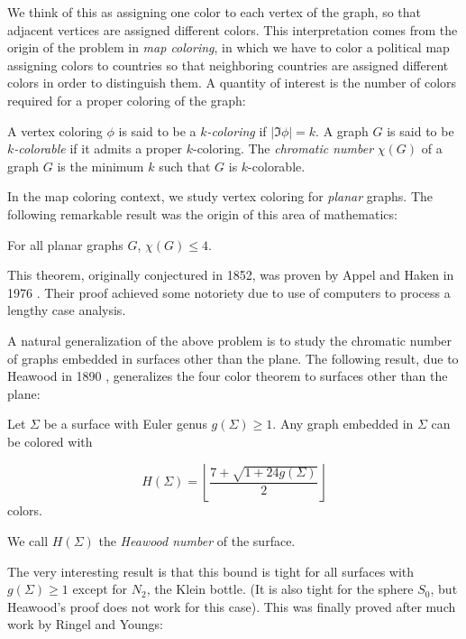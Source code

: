 We think of this as assigning one color to each vertex of the graph, so that adjacent vertices are assigned different colors. This interpretation comes from the origin of the problem in \textit{map coloring}, in which we have to color a political map assigning colors to countries so that neighboring countries are assigned different colors in order to distinguish them. A quantity of interest is the number of colors required for a proper coloring of the graph:

\begin{definition}
A vertex coloring $\phi$ is said to be a $k$\emph{-coloring} if $|\Im \phi| = k$. A graph $G$ is said to be $k$\emph{-colorable} if it admits a proper $k$-coloring. The \emph{chromatic number} $\chi(G)$ of a graph $G$ is the minimum $k$ such that $G$ is $k$-colorable. 
\end{definition}

In the map coloring context, we study vertex coloring for \emph{planar} graphs. The following remarkable result was the origin of this area of mathematics:

\begin{theorem}
For all planar graphs $G$, $\chi(G) \leq 4$.
\end{theorem}

This theorem, originally conjectured in 1852, was proven by Appel and Haken in 1976 \cite{4ct1, 4ct2}. Their proof achieved some notoriety due to use of computers to process a lengthy case analysis. 

A natural generalization of the above problem is to study the chromatic number of graphs embedded in surfaces other than the plane. The following result, due to Heawood in 1890 \cite{heawoodmapcolour}, generalizes the four color theorem to surfaces other than the plane:

\begin{theorem}[Heawood]
Let $\Sigma$ be a surface with Euler genus $g(\Sigma) \geq 1$. Any graph embedded in $\Sigma$ can be colored with

$$
H(\Sigma) = \left\lfloor \frac{7 + \sqrt{1+24g(\Sigma)}}{2} \right\rfloor
$$
colors.
\end{theorem}

We call $H(\Sigma)$ the \emph{Heawood number} of the surface.

The very interesting result is that this bound is tight for all surfaces with $g(\Sigma) \geq 1$
except for $N_2$, the Klein bottle. (It is also tight for the sphere $S_0$, but Heawood's proof
does not work for this case). This was finally proved after much work by Ringel and Youngs:

